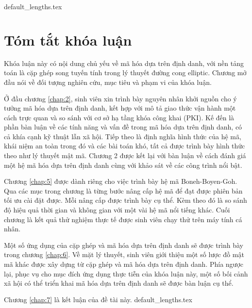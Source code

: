 \documentclass[class=report, crop=false]{standalone}
\begin{document}
	{default_lengths.tex}
	\chapter*{Tóm tắt khóa luận}
	Khóa luận này có nội dung chủ yếu về mã hóa dựa trên định danh, với nền tảng toán là cặp ghép song tuyến tính trong lý thuyết đường cong elliptic. Chương mở đầu nói về đối tượng nghiên cứu, mục tiêu và phạm vi của khóa luận.

	Ở đầu chương \ref{chap:2}, sinh viên xin trình bày nguyên nhân khởi nguồn cho ý tưởng mã hóa dựa trên định danh, kết hợp với mô tả giao thức vận hành một cách trực quan và so sánh với cơ sở hạ tầng khóa công khai (PKI). Kế đến là phần bàn luận về các tính năng và vấn đề trong mã hóa dựa trên định danh, có cả khía cạnh kỹ thuật lẫn xã hội. Tiếp theo là định nghĩa hình thức của hệ mã, khái niệm an toàn trong đó và các bài toán khó, tất cả được trình bày hình thức theo như lý thuyết mật mã. Chương 2 được kết lại với bàn luận về cách đánh giá một hệ mã hóa dựa trên định danh cùng với khảo sát về các công trình nổi bật.

	Chương \ref{chap:5} được dành riêng cho việc trình bày hệ mã Boneh-Boyen-Goh. Qua các mục trong chương là từng bước nâng cấp hệ mã để đạt được phiên bản tối ưu cài đặt được. Mỗi nâng cấp được trình bày cụ thể. Kèm theo đó là so sánh độ hiệu quả thời gian và không gian với một vài hệ mã nổi tiếng khác. Cuối chương là kết quả thử nghiệm thực tế được sinh viên chạy thử trên máy tính cá nhân.

	Một số ứng dụng của cặp ghép và mã hóa dựa trên định danh sẽ được trình bày trong chương \ref{chap:6}. Về mặt lý thuyết, sinh viên giới thiệu một số lược đồ mật mã khác được xây dựng từ cặp ghép và mã hóa dựa trên định danh. Phía ngược lại, phục vụ cho mục đích ứng dụng thực tiễn của khóa luận này, một số bối cảnh xã hội có thể triển khai mã hóa dựa trên định danh sẽ được bàn luận cụ thể.

	Chương \ref{chap:7} là kết luận của đề tài này.
	\newpage
	{default_lengths.tex}
\end{document}
